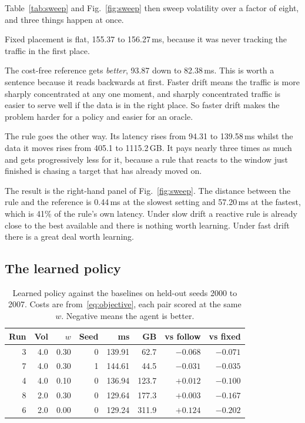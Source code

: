 Table~\ref{tab:sweep} and Fig.~\ref{fig:sweep} then sweep volatility over a
factor of eight, and three things happen at once.

Fixed placement is flat, 155.37 to 156.27\,ms, because it was never tracking
the traffic in the first place.

The cost-free reference gets \emph{better}, 93.87 down to 82.38\,ms. This is
worth a sentence because it reads backwards at first. Faster drift means the
traffic is more sharply concentrated at any one moment, and sharply
concentrated traffic is easier to serve well if the data is in the right
place. So faster drift makes the problem harder for a policy and easier for an
oracle.

The rule goes the other way. Its latency rises from 94.31 to 139.58\,ms whilst
the data it moves rises from 405.1 to 1115.2\,GB. It pays nearly three times
as much and gets progressively less for it, because a rule that reacts to the
window just finished is chasing a target that has already moved on.

The result is the right-hand panel of Fig.~\ref{fig:sweep}. The distance
between the rule and the reference is 0.44\,ms at the slowest setting and
57.20\,ms at the fastest, which is 41\% of the rule's own latency. Under slow
drift a reactive rule is already close to the best available and there is
nothing worth learning. Under fast drift there is a great deal worth learning.

\subsection{The learned policy}

\begin{table}[t]
\caption{Learned policy against the baselines on held-out seeds 2000 to 2007.
Costs are from~\eqref{eq:objective}, each pair scored at the same $w$.
Negative means the agent is better.}
\label{tab:agent}
\centering
\footnotesize
\begin{tabular}{rrrrrrrr}
\toprule
Run & Vol & $w$ & Seed & ms & GB & vs follow & vs fixed \\
\midrule
3 & 4.0 & 0.30 & 0 & 139.91 &  62.7 & $-0.068$ & $-0.071$ \\
7 & 4.0 & 0.30 & 1 & 144.61 &  44.5 & $-0.031$ & $-0.035$ \\
4 & 4.0 & 0.10 & 0 & 136.94 & 123.7 & $+0.012$ & $-0.100$ \\
8 & 2.0 & 0.30 & 0 & 129.64 & 177.3 & $+0.003$ & $-0.167$ \\
6 & 2.0 & 0.00 & 0 & 129.24 & 311.9 & $+0.124$ & $-0.202$ \\
\bottomrule
\end{tabular}
\end{table}

